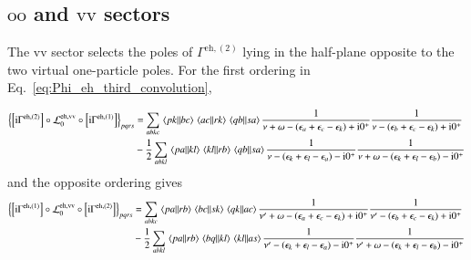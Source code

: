 \documentclass[aip,jcp,reprint,noshowkeys,superscriptaddress]{revtex4-1}
\newcommand{\eps}{\epsilon}
\newcommand{\ii}{\mathrm{i}}
\newcommand{\eh}{\text{eh}}
\begin{document}
\subsection{$\text{oo}$ and $\text{vv}$ sectors}

The $\text{vv}$ sector selects the poles of $\Gamma^{\eh,(2)}$ lying in the
half-plane opposite to the two virtual one-particle poles.
For the first ordering in Eq.~\eqref{eq:Phi_eh_third_convolution},
\begin{widetext}
\begin{equation}
    \begin{split}
    \left\{
    \left[\ii\Gamma^{\eh,(2)}\right]
    \circ\mathcal L_0^{\eh,\text{vv}}
    \circ\left[\ii\Gamma^{\eh,(1)}\right]
    \right\}_{pqrs}
    & =
    \sum_{abkc}
    \mel{pk}{}{bc}\mel{ac}{}{rk}\mel{qb}{}{sa}
    \frac{1}{\nu+\omega-(\eps_a+\eps_c-\eps_k)+\ii0^+}
    \frac{1}{\nu-(\eps_b+\eps_c-\eps_k)+\ii0^+}
    \\
    &-
    \frac12
    \sum_{abkl}
    \mel{pa}{}{kl}\mel{kl}{}{rb}\mel{qb}{}{sa}
    \frac{1}{\nu-(\eps_k+\eps_l-\eps_a)-\ii0^+}
    \frac{1}{\nu+\omega-(\eps_k+\eps_l-\eps_b)-\ii0^+}
    \end{split}
    \label{eq:Phi_eh_third_vv_left}
\end{equation}
and the opposite ordering gives
\begin{equation}
    \begin{split}
    \left\{
    \left[\ii\Gamma^{\eh,(1)}\right]
    \circ\mathcal L_0^{\eh,\text{vv}}
    \circ\left[\ii\Gamma^{\eh,(2)}\right]
    \right\}_{pqrs}
    & =
    \sum_{abkc}
    \mel{pa}{}{rb}\mel{bc}{}{sk}\mel{qk}{}{ac}
    \frac{1}{\nu'+\omega-(\eps_a+\eps_c-\eps_k)+\ii0^+}
    \frac{1}{\nu'-(\eps_b+\eps_c-\eps_k)+\ii0^+}
    \\
    &-
    \frac12
    \sum_{abkl}
    \mel{pa}{}{rb}\mel{bq}{}{kl}\mel{kl}{}{as}
    \frac{1}{\nu'-(\eps_k+\eps_l-\eps_a)-\ii0^+}
    \frac{1}{\nu'+\omega-(\eps_k+\eps_l-\eps_b)-\ii0^+}
    \end{split}
    \label{eq:Phi_eh_third_vv_right}
\end{equation}


\end{widetext}
\end{document}
